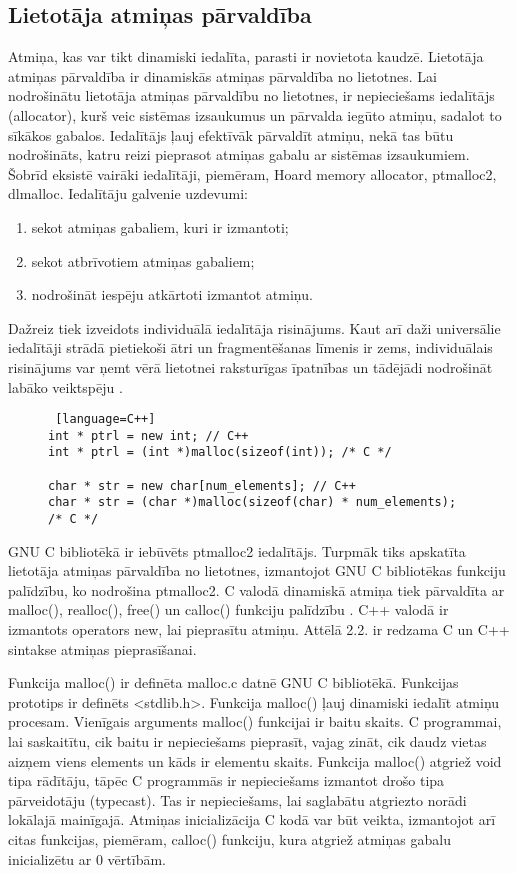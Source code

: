  
\subsection{Lietotāja atmiņas pārvaldība}
Atmiņa, kas var tikt dinamiski iedalīta, parasti ir novietota kaudzē. 
Lietotāja atmiņas pārvaldība ir dinamiskās atmiņas pārvaldība no lietotnes.
Lai nodrošinātu lietotāja atmiņas pārvaldību no lietotnes, ir nepieciešams iedalītājs (allocator), kurš veic sistēmas izsaukumus un pārvalda iegūto atmiņu, sadalot to sīkākos gabalos.
Iedalītājs ļauj efektīvāk pārvaldīt atmiņu, nekā tas būtu nodrošināts, katru reizi pieprasot atmiņas gabalu ar sistēmas izsaukumiem.
Šobrīd eksistē vairāki iedalītāji, piemēram, Hoard memory allocator, ptmalloc2, dlmalloc.
Iedalītāju galvenie uzdevumi: 
\begin{enumerate}
\item sekot atmiņas gabaliem, kuri ir izmantoti;
\item sekot atbrīvotiem atmiņas gabaliem;
\item nodrošināt iespēju atkārtoti izmantot atmiņu.
\end{enumerate}
Dažreiz tiek izveidots individuālā iedalītāja risinājums. 
Kaut arī daži universālie iedalītāji strādā pietiekoši ātri un fragmentēšanas līmenis ir zems, individuālais risinājums var ņemt vērā lietotnei raksturīgas īpatnības un tādējādi nodrošināt labāko veiktspēju \cite{EDBG}.
\begin{figure}[h]
\begin{lstlisting} [language=C++]
int * ptrl = new int; // C++
int * ptrl = (int *)malloc(sizeof(int)); /* C */

char * str = new char[num_elements]; // C++
char * str = (char *)malloc(sizeof(char) * num_elements); /* C */
\end{lstlisting}
\caption{\textbf{\fontsize{11}{12}\selectfont {Dinamiskās atmiņas iedalīšana C un C++}}}
\end{figure}

GNU C bibliotēkā ir iebūvēts ptmalloc2 iedalītājs.
Turpmāk tiks apskatīta lietotāja atmiņas pārvaldība no lietotnes, izmantojot GNU C bibliotēkas funkciju palīdzību, ko nodrošina ptmalloc2.
C valodā dinamiskā atmiņa tiek pārvaldīta ar malloc(), realloc(), free() un calloc() funkciju palīdzību \cite {PETRSOF}.
C++ valodā ir izmantots operators new, lai pieprasītu atmiņu. 
Attēlā 2.2. ir redzama C un C++ sintakse atmiņas pieprasīšanai.


Funkcija malloc() ir definēta malloc.c datnē GNU C bibliotēkā. 
Funkcijas prototips ir definēts <stdlib.h>.
Funkcija malloc() ļauj dinamiski iedalīt atmiņu procesam.
Vienīgais arguments malloc() funkcijai ir baitu skaits.
C programmai, lai saskaitītu, cik baitu ir nepieciešams pieprasīt, vajag zināt, cik daudz vietas aizņem viens elements un kāds ir elementu skaits.
Funkcija malloc() atgriež void tipa rādītāju, tāpēc C programmās ir nepieciešams izmantot drošo tipa pārveidotāju (typecast). 
Tas ir nepieciešams, lai saglabātu atgriezto norādi lokālajā mainīgajā. Atmiņas inicializācija C kodā
var būt veikta, izmantojot arī citas funkcijas, piemēram, calloc() funkciju, kura atgriež atmiņas gabalu inicializētu ar 0 vērtībām.


